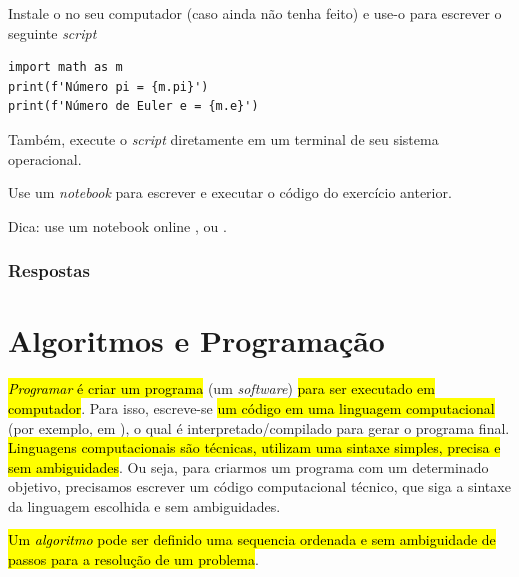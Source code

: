 \begin{exer}
  Instale o {\spyder} no seu computador (caso ainda não tenha feito) e use-o para escrever o seguinte \textit{script}

\begin{lstlisting}
import math as m
print(f'Número pi = {m.pi}')
print(f'Número de Euler e = {m.e}')
\end{lstlisting}

  Também, execute o \textit{script} diretamente em um terminal de seu sistema operacional.
\end{exer}

\begin{exer}
  Use um \textit{notebook} {\python} para escrever e executar o código do exercício anterior.
\end{exer}
\begin{resp}
  Dica: use um notebook online {\colab}, {\kaggle} ou {\jupyter}.
\end{resp}

\ifisbook
\subsubsection{Respostas}
\shipoutAnswer
\fi

\section{Algoritmos e Programação}\label{cap_lingua_sec_algoprog}

\hl{\emph{Programar} é criar um programa} (um \textit{software}) \hl{para ser executado em computador}. Para isso, escreve-se \hl{um código em uma linguagem computacional} (por exemplo, em {\python}), o qual é interpretado/compilado para gerar o programa final. \hl{Linguagens computacionais são técnicas, utilizam uma sintaxe simples, precisa e sem ambiguidades}. Ou seja, para criarmos um programa com um determinado objetivo, precisamos escrever um código computacional técnico, que siga a sintaxe da linguagem escolhida e sem ambiguidades.

\hl{Um \emph{algoritmo} pode ser definido uma sequencia ordenada e sem ambiguidade de passos para a resolução de um problema}.

